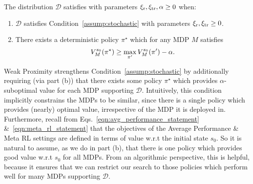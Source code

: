 \documentclass[11pt,twoside]{article}
\begin{document}
\begin{condition}[\weakprox{}]
\label{assump:lower_bound_deterministic}
The distribution $\mathcal{D}$ satisfies \weakprox{} with parameters $\operatorname{\xi_r}, \operatorname{\xi_{tr}}, \alpha \geq 0$ when:
\begin{enumerate}[label=(\alph*), leftmargin=*]
\item $\mathcal{D}$ satisfies Condition~\ref{assump:stochastic} with parameters $\operatorname{\xi_r}, \operatorname{\xi_{tr}} \geq 0$.
\item There exists a deterministic policy $\pi^\star$ which for any MDP $M$ satisfies
$$
V^{{s_0 }}_{{M }}({\pi^\star}) \geq \max_{\pi'} V^{{s_0 }}_{{M }}({\pi'}) - \alpha.
$$
\begin{comment}
\item There exists a (fixed and known) algorithm and a (fixed and known) $k > 0$, such that given any MDP $M$ and any state $s$, this algorithm can identify $\pi$ which satisfies
$$
\V{s}{M}{\pi} = \max_{\pi'} \V{s}{M}{\pi'},
$$
in $\mathcal{O}(\vert \ActSet \vert H^{k})$ queries. Moreover if we sample $M$ from $\mathcal{D}$, but do not query any MDP supporting $\mathcal{D}$ beforehand, then any algorithm that can find $\pi$ satisfying
$$
\V{s_0}{M}{\pi} \geq \max_{\pi'} \V{s_0}{M}{\pi'} - \nicefrac{1}{4},
$$
with probability at least $\nicefrac{3}{4}$ over the selection of $M$, requires $\Omega(\vert \ActSet \vert H^k)$ queries on $M$.
\end{comment}
\end{enumerate}
\end{condition}
Weak Proximity strengthens Condition~\ref{assump:stochastic} by additionally requiring (via part (b)) that there exists some policy $\pi^\star$ which provides $\alpha$-suboptimal value for each MDP supporting $\mathcal{D}$. Intuitively, this condition implicitly constrains the MDPs to be similar, since there is a single policy which provides (nearly) optimal value, irrespective of the MDP it is deployed in. Furthermore, recall from Eqs.~\eqref{eqn:avg_performance_statement} \&~\eqref{eqn:meta_rl_statement} that the objectives of the Average Performance \& Meta RL settings are defined in terms of value w.r.t the initial state $s_0$. So it is natural to assume, as we do in part (b), that there is one policy which provides good value w.r.t $s_0$ for all MDPs. From an algorithmic perspective, this is helpful, because it ensures that we can restrict our search to those policies which perform well for many MDPs supporting $\mathcal{D}$.
\end{document}
